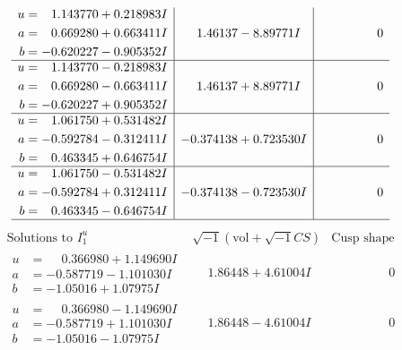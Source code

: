 \documentclass[1p]{elsarticle_modified}
\theoremstyle{definition}
\newcommand{\I}{\sqrt{-1}}
\begin{document}
$$\begin{array}{c|c|c}
\begin{aligned}
u &= \phantom{-}1.143770 + 0.218983 I \\
a &= \phantom{-}0.669280 + 0.663411 I \\
b &= -0.620227 - 0.905352 I\end{aligned}
 & \phantom{-}1.46137 - 8.89771 I & \phantom{-0.000000 } 0 \\ \hline\begin{aligned}
u &= \phantom{-}1.143770 - 0.218983 I \\
a &= \phantom{-}0.669280 - 0.663411 I \\
b &= -0.620227 + 0.905352 I\end{aligned}
 & \phantom{-}1.46137 + 8.89771 I & \phantom{-0.000000 } 0 \\ \hline\begin{aligned}
u &= \phantom{-}1.061750 + 0.531482 I \\
a &= -0.592784 - 0.312411 I \\
b &= \phantom{-}0.463345 + 0.646754 I\end{aligned}
 & -0.374138 + 0.723530 I & \phantom{-0.000000 } 0 \\ \hline\begin{aligned}
u &= \phantom{-}1.061750 - 0.531482 I \\
a &= -0.592784 + 0.312411 I \\
b &= \phantom{-}0.463345 - 0.646754 I\end{aligned}
 & -0.374138 - 0.723530 I & \phantom{-0.000000 } 0\\
 \hline 
 \end{array}$$\newpage$$\begin{array}{c|c|c}  
\text{Solutions to }I^u_{1}& \I (\text{vol} + \sqrt{-1}CS) & \text{Cusp shape}\\
 \hline 
\begin{aligned}
u &= \phantom{-}0.366980 + 1.149690 I \\
a &= -0.587719 - 1.101030 I \\
b &= -1.05016 + 1.07975 I\end{aligned}
 & \phantom{-}1.86448 + 4.61004 I & \phantom{-0.000000 } 0 \\ \hline\begin{aligned}
u &= \phantom{-}0.366980 - 1.149690 I \\
a &= -0.587719 + 1.101030 I \\
b &= -1.05016 - 1.07975 I\end{aligned}
 & \phantom{-}1.86448 - 4.61004 I & \phantom{-0.000000 } 0 \\ \hline\begin{aligned}

\end{aligned}
\end{array}$$
\end{document}
